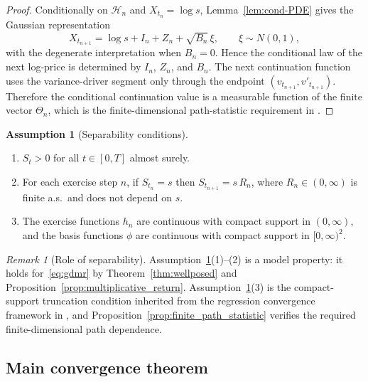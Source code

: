 \documentclass[10pt]{article}
\theoremstyle{plain}
\theoremstyle{definition}
\newtheorem{assumption}[theorem]{Assumption}
\theoremstyle{remark}
\newtheorem{remark}[theorem]{Remark}
\begin{document}
\begin{proof}
Conditionally on $\mathcal H_n$ and $X_{t_n}=\log s$, Lemma~\ref{lem:cond-PDE} gives the Gaussian representation
\[
X_{t_{n+1}}=\log s+I_n+Z_n+\sqrt{B_n}\,\xi,
\qquad \xi\sim N(0,1),
\]
with the degenerate interpretation when $B_n=0$. Hence the conditional law of the next log-price is determined
by $I_n$, $Z_n$, and $B_n$. The next continuation function uses the variance-driver segment only through the
endpoint $(v_{t_{n+1}},v'_{t_{n+1}})$. Therefore the conditional continuation value is a measurable function of
the finite vector $\Theta_n$, which is the finite-dimensional path-statistic requirement in
\cite{farahany2020mixing}.
\end{proof}

\begin{assumption}[Separability conditions]
\label{ass:separability}
\begin{enumerate}
\item $S_t>0$ for all $t\in[0,T]$ almost surely.
\item For each exercise step $n$, if $S_{t_n}=s$ then $S_{t_{n+1}}=s\,R_n$, where
$R_n\in(0,\infty)$ is finite a.s.\ and does not depend on $s$.
\item The exercise functions $h_n$ are continuous with compact support in $(0,\infty)$, and the basis functions
$\phi$ are continuous with compact support in $[0,\infty)^2$.
\end{enumerate}
\end{assumption}

\begin{remark}[Role of separability]\label{rem:role-separability}
Assumption~\ref{ass:separability}(1)--(2) is a model property: it holds for~\eqref{eq:gdmr} by Theorem~\ref{thm:wellposed}
and Proposition~\ref{prop:multiplicative_return}. Assumption~\ref{ass:separability}(3) is the compact-support
truncation condition inherited from the regression convergence framework in \cite{farahany2020mixing}, and
Proposition~\ref{prop:finite_path_statistic} verifies the required finite-dimensional path dependence.
\end{remark}



\subsection{Main convergence theorem}
\label{subsec:main_convergence}
\end{document}
